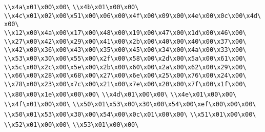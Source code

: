 \verb|\\x4a\x01\x00\x00\|\newline
\verb|\\x4b\x01\x00\x00\|\newline
\verb|\\x4c\x01\x02\x00\x51\x00\x06\x00\x4f\x00\x09\x00\x4e\x00\x0c\x00\x4d\x00\|\newline
\verb|\\x12\x00\x4a\x00\x17\x00\x48\x00\x19\x00\x47\x00\x1d\x00\x46\x00\|\newline
\verb|\\x27\x00\x42\x00\x29\x00\x41\x00\x2b\x00\x40\x00\x40\x00\x37\x00\|\newline
\verb|\\x42\x00\x36\x00\x43\x00\x35\x00\x45\x00\x34\x00\x4a\x00\x33\x00\|\newline
\verb|\\x53\x00\x30\x00\x55\x00\x2f\x00\x58\x00\x2d\x00\x5a\x00\x61\x00\|\newline
\verb|\\x5c\x00\x2c\x00\x5e\x00\x2b\x00\x60\x00\x2a\x00\x62\x00\x29\x00\|\newline
\verb|\\x66\x00\x28\x00\x68\x00\x27\x00\x6e\x00\x25\x00\x76\x00\x24\x00\|\newline
\verb|\\x78\x00\x23\x00\x7c\x00\x21\x00\x7e\x00\x20\x00\x7f\x00\x1f\x00\|\newline
\verb|\\x80\x00\x1e\x00\x00\x00\|\newline
\verb|\\x4d\x01\x00\x00\|\newline
\verb|\\x4e\x01\x00\x00\|\newline
\verb|\\x4f\x01\x00\x00\|\newline
\verb|\\x50\x01\x53\x00\x30\x00\x54\x00\xef\x00\x00\x00\|\newline
\verb|\\x50\x01\x53\x00\x30\x00\x54\x00\x0c\x01\x00\x00\|\newline
\verb|\\x51\x01\x00\x00\|\newline
\verb|\\x52\x01\x00\x00\|\newline
\verb|\\x53\x01\x00\x00\|\newline
